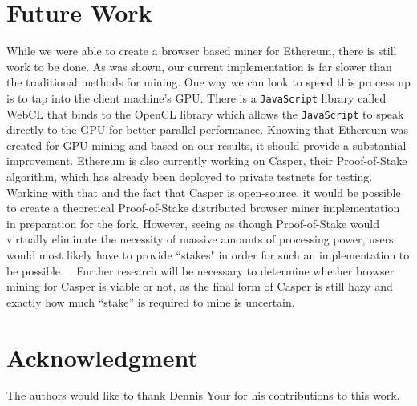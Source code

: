 \documentclass[runningheads]{llncs}
\begin{document}
\section{Future Work}
While we were able to create a browser based miner for Ethereum, there is still work to be done. As was shown, our current implementation is far slower than the traditional methods for mining. One way we can look to speed this process up is to tap into the client machine's GPU. There is a \verb|JavaScript| library called WebCL that binds to the OpenCL library which allows the \verb|JavaScript| to speak directly to the GPU for better parallel performance. Knowing that Ethereum was created for GPU mining and based on our results, it should provide a substantial improvement. 
Ethereum is also currently working on Casper, their Proof-of-Stake algorithm, which has already been deployed to private testnets for testing. Working with that and the fact that Casper is open-source, it would be possible to create a theoretical Proof-of-Stake distributed browser miner implementation in preparation for the fork. However, seeing as though Proof-of-Stake would virtually eliminate the necessity of massive amounts of processing power, users would most likely have to provide ``stakes" in order for such an implementation to be possible ~\cite{PoSproof}. Further research will be necessary to determine whether browser mining for Casper is viable or not, as the final form of Casper is still hazy and exactly how much ``stake'' is required to mine is uncertain.




\section*{Acknowledgment}
The authors would like to thank Dennis Your for his contributions to this work.
\end{document}
